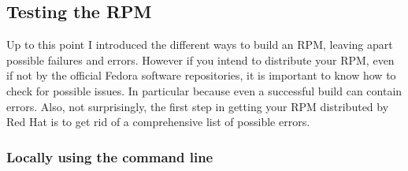 \newpage
\subsection{Testing the RPM}
\label{rpmtesting}

Up to this point I introduced the different ways to build an RPM, leaving apart possible failures and errors. 
However if you intend to distribute your RPM, even if not by the official Fedora software repositories, it is important to know 
how to check for possible issues. In particular because even a successful build can contain errors.  
Also, not surprisingly, the first step in getting your RPM distributed by Red Hat is to get rid of 
a comprehensive list of possible errors. 

\subsubsection{Locally using the command line}

